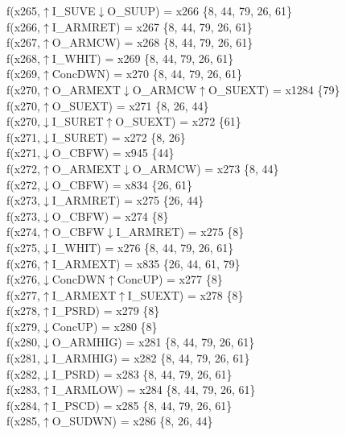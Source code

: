 f(x265,$\uparrow$I\_SUVE$\downarrow$O\_SUUP) = x266 \{8, 44, 79, 26, 61\} \\  
f(x266,$\uparrow$I\_ARMRET) = x267 \{8, 44, 79, 26, 61\} \\  
f(x267,$\uparrow$O\_ARMCW) = x268 \{8, 44, 79, 26, 61\} \\  
f(x268,$\uparrow$I\_WHIT) = x269 \{8, 44, 79, 26, 61\} \\  
f(x269,$\uparrow$ConcDWN) = x270 \{8, 44, 79, 26, 61\} \\  
f(x270,$\uparrow$O\_ARMEXT$\downarrow$O\_ARMCW$\uparrow$O\_SUEXT) = x1284 \{79\} \\  
f(x270,$\uparrow$O\_SUEXT) = x271 \{8, 26, 44\} \\  
f(x270,$\downarrow$I\_SURET$\uparrow$O\_SUEXT) = x272 \{61\} \\  
f(x271,$\downarrow$I\_SURET) = x272 \{8, 26\} \\  
f(x271,$\downarrow$O\_CBFW) = x945 \{44\} \\  
f(x272,$\uparrow$O\_ARMEXT$\downarrow$O\_ARMCW) = x273 \{8, 44\} \\  
f(x272,$\downarrow$O\_CBFW) = x834 \{26, 61\} \\  
f(x273,$\downarrow$I\_ARMRET) = x275 \{26, 44\} \\  
f(x273,$\downarrow$O\_CBFW) = x274 \{8\} \\  
f(x274,$\uparrow$O\_CBFW$\downarrow$I\_ARMRET) = x275 \{8\} \\  
f(x275,$\downarrow$I\_WHIT) = x276 \{8, 44, 79, 26, 61\} \\  
f(x276,$\uparrow$I\_ARMEXT) = x835 \{26, 44, 61, 79\} \\  
f(x276,$\downarrow$ConcDWN$\uparrow$ConcUP) = x277 \{8\} \\  
f(x277,$\uparrow$I\_ARMEXT$\uparrow$I\_SUEXT) = x278 \{8\} \\  
f(x278,$\uparrow$I\_PSRD) = x279 \{8\} \\  
f(x279,$\downarrow$ConcUP) = x280 \{8\} \\  
f(x280,$\downarrow$O\_ARMHIG) = x281 \{8, 44, 79, 26, 61\} \\  
f(x281,$\downarrow$I\_ARMHIG) = x282 \{8, 44, 79, 26, 61\} \\  
f(x282,$\downarrow$I\_PSRD) = x283 \{8, 44, 79, 26, 61\} \\  
f(x283,$\uparrow$I\_ARMLOW) = x284 \{8, 44, 79, 26, 61\} \\  
f(x284,$\uparrow$I\_PSCD) = x285 \{8, 44, 79, 26, 61\} \\  
f(x285,$\uparrow$O\_SUDWN) = x286 \{8, 26, 44\} \\  
